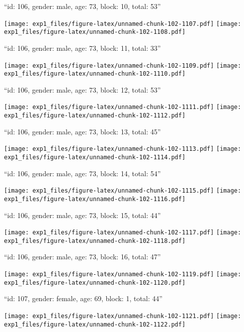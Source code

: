 \documentclass[11pt,,]{article}
\begin{document}
\newpage
[1] 

``id: 106, gender: male, age: 73, block: 10, total: 53''

\texttt{[image: exp1\_files/figure-latex/unnamed-chunk-102-1107.pdf]}
\texttt{[image: exp1\_files/figure-latex/unnamed-chunk-102-1108.pdf]}

\newpage
[1] 

``id: 106, gender: male, age: 73, block: 11, total: 33''

\texttt{[image: exp1\_files/figure-latex/unnamed-chunk-102-1109.pdf]}
\texttt{[image: exp1\_files/figure-latex/unnamed-chunk-102-1110.pdf]}

\newpage
[1] 

``id: 106, gender: male, age: 73, block: 12, total: 53''

\texttt{[image: exp1\_files/figure-latex/unnamed-chunk-102-1111.pdf]}
\texttt{[image: exp1\_files/figure-latex/unnamed-chunk-102-1112.pdf]}

\newpage
[1] 

``id: 106, gender: male, age: 73, block: 13, total: 45''

\texttt{[image: exp1\_files/figure-latex/unnamed-chunk-102-1113.pdf]}
\texttt{[image: exp1\_files/figure-latex/unnamed-chunk-102-1114.pdf]}

\newpage
[1] 

``id: 106, gender: male, age: 73, block: 14, total: 54''

\texttt{[image: exp1\_files/figure-latex/unnamed-chunk-102-1115.pdf]}
\texttt{[image: exp1\_files/figure-latex/unnamed-chunk-102-1116.pdf]}

\newpage
[1] 

``id: 106, gender: male, age: 73, block: 15, total: 44''

\texttt{[image: exp1\_files/figure-latex/unnamed-chunk-102-1117.pdf]}
\texttt{[image: exp1\_files/figure-latex/unnamed-chunk-102-1118.pdf]}

\newpage
[1] 

``id: 106, gender: male, age: 73, block: 16, total: 47''

\texttt{[image: exp1\_files/figure-latex/unnamed-chunk-102-1119.pdf]}
\texttt{[image: exp1\_files/figure-latex/unnamed-chunk-102-1120.pdf]}

\newpage
[1] 

``id: 107, gender: female, age: 69, block: 1, total: 44''

\texttt{[image: exp1\_files/figure-latex/unnamed-chunk-102-1121.pdf]}
\texttt{[image: exp1\_files/figure-latex/unnamed-chunk-102-1122.pdf]}
\end{document}
